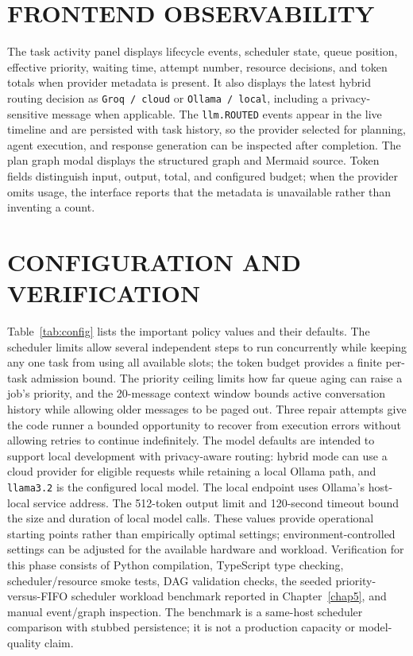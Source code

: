 \section{\uppercase{Frontend Observability}}
The task activity panel displays lifecycle events, scheduler state, queue position, effective priority, waiting time, attempt number, resource decisions, and token totals when provider metadata is present. It also displays the latest hybrid routing decision as \texttt{Groq / cloud} or \texttt{Ollama / local}, including a privacy-sensitive message when applicable. The \texttt{llm.ROUTED} events appear in the live timeline and are persisted with task history, so the provider selected for planning, agent execution, and response generation can be inspected after completion. The plan graph modal displays the structured graph and Mermaid source. Token fields distinguish input, output, total, and configured budget; when the provider omits usage, the interface reports that the metadata is unavailable rather than inventing a count.

\section{\uppercase{Configuration and Verification}}
Table~\ref{tab:config} lists the important policy values and their defaults. The scheduler limits allow several independent steps to run concurrently while keeping any one task from using all available slots; the token budget provides a finite per-task admission bound. The priority ceiling limits how far queue aging can raise a job's priority, and the 20-message context window bounds active conversation history while allowing older messages to be paged out. Three repair attempts give the code runner a bounded opportunity to recover from execution errors without allowing retries to continue indefinitely.
The model defaults are intended to support local development with privacy-aware routing: hybrid mode can use a cloud provider for eligible requests while retaining a local Ollama path, and \texttt{llama3.2} is the configured local model. The local endpoint uses Ollama's host-local service address. The 512-token output limit and 120-second timeout bound the size and duration of local model calls. These values provide operational starting points rather than empirically optimal settings; environment-controlled settings can be adjusted for the available hardware and workload. Verification for this phase consists of Python compilation, TypeScript type checking, scheduler/resource smoke tests, DAG validation checks, the seeded priority-versus-FIFO scheduler workload benchmark reported in Chapter~\ref{chap5}, and manual event/graph inspection. The benchmark is a same-host scheduler comparison with stubbed persistence; it is not a production capacity or model-quality claim.


